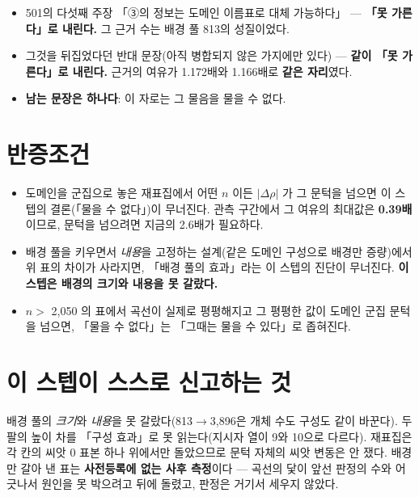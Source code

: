 \documentclass[10pt]{article}
\begin{document}
\begin{itemize}
\item 501의 다섯째 주장 「③의 정보는 도메인 이름표로 대체 가능하다」 --- \textbf{「못 가른다」로 내린다.}
      그 근거 수는 배경 풀 813의 성질이었다.
\item 그것을 뒤집었다던 반대 문장(아직 병합되지 않은 가지에만 있다) --- \textbf{같이 「못 가른다」로 내린다.}
      근거의 여유가 1.172배와 1.166배로 \textbf{같은 자리}였다.
\item \textbf{남는 문장은 하나다}: 이 자로는 그 물음을 물을 수 없다.
\end{itemize}

\section{반증조건}

\begin{itemize}
\item 도메인을 군집으로 놓은 재표집에서 어떤 $n$ 이든 $|\Delta\rho|$ 가 그 문턱을 넘으면
      이 스텝의 결론(「물을 수 없다」)이 무너진다. 관측 구간에서 그 여유의 최대값은
      \textbf{0.39배}이므로, 문턱을 넘으려면 지금의 2.6배가 필요하다.
\item 배경 풀을 키우면서 \emph{내용}을 고정하는 설계(같은 도메인 구성으로 배경만 증량)에서
      위 표의 차이가 사라지면, 「배경 풀의 효과」라는 이 스텝의 진단이 무너진다.
      \textbf{이 스텝은 배경의 크기와 내용을 못 갈랐다.}
\item $n>$ 2,050 의 표에서 곡선이 실제로 평평해지고 그 평평한 값이 도메인 군집 문턱을
      넘으면, 「물을 수 없다」는 「그때는 물을 수 있다」로 좁혀진다.
\end{itemize}

\section{이 스텝이 스스로 신고하는 것}

배경 풀의 \emph{크기}와 \emph{내용}을 못 갈랐다(813$\to$3,896은 개체 수도 구성도 같이
바꾼다). 두 팔의 높이 차를 「구성 효과」로 못 읽는다(지시자 열이 9와 10으로 다르다).
재표집은 각 칸의 씨앗 0 표본 하나 위에서만 돌았으므로 문턱 자체의 씨앗 변동은 안 쟀다.
배경만 갈아 낸 표는 \textbf{사전등록에 없는 사후 측정}이다 --- 곡선의 닻이 앞선 판정의
수와 어긋나서 원인을 못 박으려고 뒤에 돌렸고, 판정은 거기서 세우지 않았다.
\end{document}
